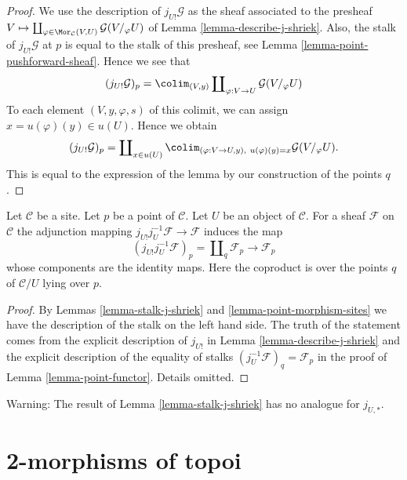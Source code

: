 \begin{proof}
We use the description of $j_{U!}\mathcal{G}$ as the sheaf associated
to the presheaf
$V \mapsto
\coprod\nolimits_{\varphi \in \Mor_\mathcal{C}(V, U)}
\mathcal{G}(V/_\varphi U)$
of
Lemma \ref{lemma-describe-j-shriek}.
Also, the stalk of $j_{U!}\mathcal{G}$ at $p$ is equal to the
stalk of this presheaf, see
Lemma \ref{lemma-point-pushforward-sheaf}.
Hence we see that
$$
(j_{U!}\mathcal{G})_p =
\colim_{(V, y)} \coprod\nolimits_{\varphi : V \to U} \mathcal{G}(V/_\varphi U)
$$
To each element $(V, y, \varphi, s)$ of this colimit, we can assign
$x = u(\varphi)(y) \in u(U)$. Hence we obtain
$$
(j_{U!}\mathcal{G})_p =
\coprod\nolimits_{x \in u(U)}
\colim_{(\varphi : V \to U, y), \ u(\varphi)(y) = x} \mathcal{G}(V/_\varphi U).
$$
This is equal to the expression of the lemma by our
construction of the points $q$.
\end{proof}

\begin{lemma}
\label{lemma-adjunction-on-stalk-j-shriek-j-inverse}
Let $\mathcal{C}$ be a site.
Let $p$ be a point of $\mathcal{C}$. Let $U$ be an object of $\mathcal{C}$.
For a sheaf $\mathcal{F}$ on $\mathcal{C}$ the adjunction mapping
$j_{U!}j_U^{-1}\mathcal{F} \to \mathcal{F}$ induces the map
$$
(j_{U!}j_U^{-1}\mathcal{F})_p =
\coprod\nolimits_q \mathcal{F}_p
\longrightarrow
\mathcal{F}_p
$$
whose components are the identity maps. Here the coproduct
is over the points $q$ of $\mathcal{C}/U$ lying over $p$.
\end{lemma}

\begin{proof}
By Lemmas \ref{lemma-stalk-j-shriek} and \ref{lemma-point-morphism-sites}
we have the description of the stalk on the left hand side.
The truth of the statement comes from the explicit
description of $j_{U!}$ in Lemma \ref{lemma-describe-j-shriek}
and the explicit description of the equality of stalks
$(j_U^{-1}\mathcal{F})_q = \mathcal{F}_p$
in the proof of Lemma \ref{lemma-point-functor}.
Details omitted.
\end{proof}

\begin{remark}
\label{remark-not-pushforward}
Warning: The result of
Lemma \ref{lemma-stalk-j-shriek}
has no analogue for $j_{U, *}$.
\end{remark}




\section{2-morphisms of topoi}
\label{section-2-category}

